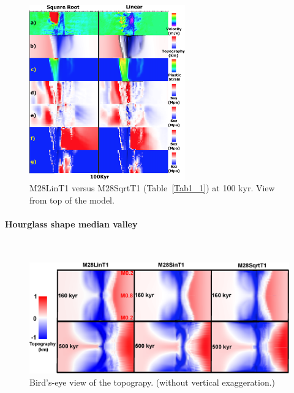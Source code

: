 \begin{figure}[h]
  \centering
    \includegraphics[width=0.6\textwidth]{./Figures/fig_Results4_3_sqrt_vs_lin_cut_back_100kyr.eps}
  \caption{M28LinT1 versus M28SqrtT1 (Table~\hyperref[Tab1_1]{\ref{Tab1_1}}) at 100 kyr. View from top of the model.}
 \label{fig_Results4_3_2}
\end{figure} 
\fi

\paragraph{Hourglass shape median valley}
~\\
\begin{figure}[h]
  \centering
    \includegraphics[width=1.0\textwidth]{./Figures/fig_Results_3_3_1_hourglass.eps}
  \caption{Bird's-eye view of the topograpy. (without vertical exaggeration.)}
 \label{fig_Results_3_3_1_hourglass}
\end{figure} 

